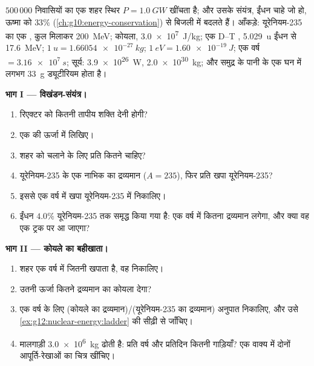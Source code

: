 \begin{problem}
\label{pb:g12:nuclear-energy:1}
$500\,000$ निवासियों का एक शहर स्थिर  $P = \qty{1.0}{GW}$ खींचता है;
और उसके संयंत्र, ईंधन चाहे जो हो, ऊष्मा को  $33\%$ (\cref{ch:g10:energy-conservation}) से
बिजली में बदलते हैं। आँकड़े: यूरेनियम-235 का एक , कुल मिलाकर
\qty{200}{MeV}; कोयला, \qty{3.0e7}{J/kg}; एक D--T , \qty{5.029}{u} ईंधन से \qty{17.6}{MeV};
$\qty{1}{u} = \qty{1.66054e-27}{kg}$; $\qty{1}{eV} = \qty{1.60e-19}{J}$; एक वर्ष $= \qty{3.16e7}{s}$; सूर्य: \qty{3.9e26}{W}, \qty{2.0e30}{kg}; और समुद्र के पानी
के एक घन  में लगभग \qty{33}{g} ड्यूटीरियम होता है।

\medskip
\noindent\textbf{भाग I --- विखंडन-संयंत्र।}
\begin{enumerate}
  \item रिएक्टर को कितनी तापीय शक्ति देनी होगी?
  \item एक  की ऊर्जा  में लिखिए।
  \item शहर को चलाने के लिए प्रति  कितने  चाहिए?
  \item यूरेनियम-235 के एक नाभिक का द्रव्यमान ($A = 235$), फिर प्रति
         खपा यूरेनियम-235?
  \item इससे एक वर्ष में खपा यूरेनियम-235  में निकालिए।
  \item ईंधन $4.0\%$ यूरेनियम-235 तक समृद्ध किया गया है: एक वर्ष में कितना
        द्रव्यमान लगेगा, और क्या वह एक ट्रक पर आ जाएगा?
\end{enumerate}

\medskip
\noindent\textbf{भाग II --- कोयले का बहीखाता।}
\begin{enumerate}[resume]
  \item शहर एक वर्ष में जितनी  खपाता है, वह निकालिए।
  \item उतनी ऊर्जा कितने द्रव्यमान का कोयला देगा?
  \item एक वर्ष के लिए (कोयले का द्रव्यमान)/(यूरेनियम-235 का द्रव्यमान)
        अनुपात निकालिए, और उसे \cref{ex:g12:nuclear-energy:ladder} की सीढ़ी से जाँचिए।
  \item मालगाड़ी \qty{3.0e6}{kg} ढोती है: प्रति वर्ष और प्रतिदिन कितनी गाड़ियाँ? एक
        वाक्य में दोनों आपूर्ति-रेखाओं का चित्र खींचिए।
\end{enumerate}


\end{problem}
